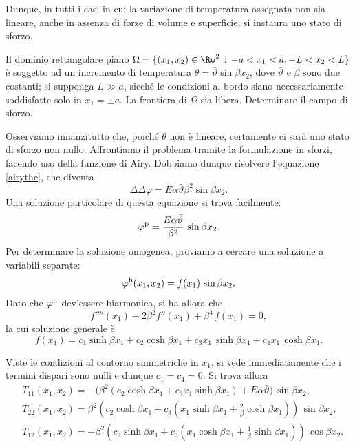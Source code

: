 Dunque, in tutti i casi in cui la variazione di temperatura assegnata non sia lineare, anche in assenza di forze di volume e superficie, si instaura uno stato di sforzo.


\begin{exercise}
Il dominio rettangolare piano $\Omega=\{(x_1,x_2)\in \Ro^2 \,:\, -a<x_1<a, -L<x_2<L  \}$ è soggetto ad un incremento di temperatura $\theta=\bar{\vartheta} \sin \beta x_2$, dove $\bar{\vartheta}$ e $\beta$ sono due costanti; si supponga $L\gg a$, sicché le condizioni al bordo siano necessariamente soddisfatte solo in $x_1=\pm a$.  La frontiera di $\Omega$ sia libera. Determinare il campo di sforzo.
\begin{svolgimento}
Osserviamo innanzitutto che, poiché $\theta$ non è lineare, certamente ci sarà uno stato di sforzo non nullo. Affrontiamo il problema tramite la formulazione in sforzi, facendo uso della funzione di Airy. Dobbiamo dunque risolvere l'equazione  \eqref{airythe}, che diventa
\begin{equation}
\Delta\Delta \varphi=E\alpha\bar{\vartheta}\beta^2\sin \beta x_2.
\end{equation}
Una soluzione particolare di questa equazione si trova facilmente:
\begin{equation}
\varphi^{\rm p}=\frac{E\alpha\bar{\vartheta}}{\beta^2}\, \sin \beta x_2.
\end{equation}
Per determinare la soluzione omogenea, proviamo a cercare una soluzione a variabili separate:
\begin{equation}
\varphi^{\rm h}(x_1, x_2)=f(x_1)\,\sin \beta x_2.
\end{equation}
Dato che $\varphi^{\rm h}$ dev'essere biarmonica, si ha allora che
\begin{equation}
	f''''(x_1)-2\beta^2 f''(x_1)+\beta^4\, f(x_1)=0,
\end{equation}
la cui soluzione generale è
\begin{equation}
f(x_1)=c_1 \sinh \beta x_1+c_2\cosh \beta x_1+c_3 x_1\, \sinh\beta x_1+c_4 x_1\, \cosh \beta x_1.
\end{equation}

Viste le condizioni al contorno simmetriche in $x_1$, si vede immediatamente che i termini dispari sono nulli e dunque $c_1=c_4=0$. Si trova allora
\begin{equation}
\begin{aligned}
&T_{11}(x_1, x_2)=-\Big( \beta^2 (c_2\cosh \beta x_1+c_3 x_1 \sinh \beta x_1)+E\alpha\bar{\vartheta} \Big)\,\sin\beta x_2,\\
& T_{22}(x_1,x_2)=\beta^2\left( c_2\cosh\beta x_1+c_3\left( x_1\sinh \beta x_1+\frac{2}{\beta}\cosh \beta x_1 \right)  \right)\,\sin\beta x_2,\\
&T_{12}(x_1,x_2)=-\beta^2 \left( c_2\sinh\beta x_1+c_3\left( x_1\cosh \beta x_1+\frac{1}{\beta}\sinh \beta x_1 \right)  \right)\,\cos\beta x_2.
\end{aligned}
\end{equation}


\end{svolgimento}
\end{exercise}
